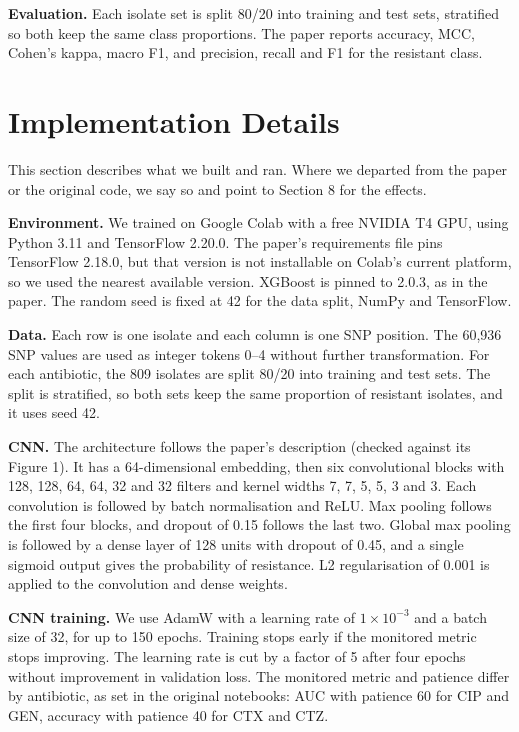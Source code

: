 \documentclass[11pt]{article}
\begin{document}
\textbf{Evaluation.} Each isolate set is split 80/20 into training and test sets, stratified so both keep the same class proportions. The paper reports accuracy, MCC, Cohen's kappa, macro F1, and precision, recall and F1 for the resistant class.

\section{Implementation Details}

This section describes what we built and ran. Where we departed from the paper or the original code, we say so and point to Section 8 for the effects.

\textbf{Environment.} We trained on Google Colab with a free NVIDIA T4 GPU, using Python 3.11 and TensorFlow 2.20.0. The paper's requirements file pins TensorFlow 2.18.0, but that version is not installable on Colab's current platform, so we used the nearest available version. XGBoost is pinned to 2.0.3, as in the paper. The random seed is fixed at 42 for the data split, NumPy and TensorFlow.

\textbf{Data.} Each row is one isolate and each column is one SNP position. The 60,936 SNP values are used as integer tokens 0--4 without further transformation. For each antibiotic, the 809 isolates are split 80/20 into training and test sets. The split is stratified, so both sets keep the same proportion of resistant isolates, and it uses seed 42.

\textbf{CNN.} The architecture follows the paper's description (checked against its Figure 1). It has a 64-dimensional embedding, then six convolutional blocks with 128, 128, 64, 64, 32 and 32 filters and kernel widths 7, 7, 5, 5, 3 and 3. Each convolution is followed by batch normalisation and ReLU. Max pooling follows the first four blocks, and dropout of 0.15 follows the last two. Global max pooling is followed by a dense layer of 128 units with dropout of 0.45, and a single sigmoid output gives the probability of resistance. L2 regularisation of 0.001 is applied to the convolution and dense weights.

\textbf{CNN training.} We use AdamW with a learning rate of $1\times10^{-3}$ and a batch size of 32, for up to 150 epochs. Training stops early if the monitored metric stops improving. The learning rate is cut by a factor of 5 after four epochs without improvement in validation loss. The monitored metric and patience differ by antibiotic, as set in the original notebooks: AUC with patience 60 for CIP and GEN, accuracy with patience 40 for CTX and CTZ.
\end{document}
